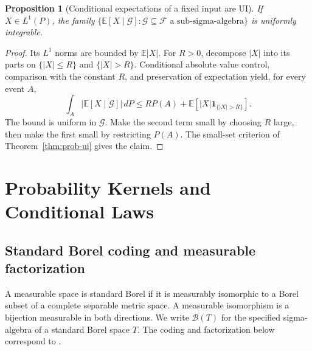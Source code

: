 \documentclass[11pt,oneside,openany]{book}
\theoremstyle{plain}
\newtheorem{proposition}[theorem]{Proposition}
\theoremstyle{definition}
\theoremstyle{remark}
\begin{document}
\begin{proposition}[Conditional expectations of a fixed input are UI]
\label{thm:prob-condexp-ui}
If \(X\in L^1(P)\), the family
\(\{\mathbb E[X\mid\mathcal G]:\mathcal G\subseteq\mathcal F
\text{ a sub-sigma-algebra}\}\) is uniformly integrable.
\end{proposition}
\begin{proof}
Its \(L^1\) norms are bounded by \(\mathbb E|X|\).
For \(R>0\), decompose \(|X|\) into its parts on
\(\{|X|\le R\}\) and \(\{|X|>R\}\). Conditional absolute value
control, comparison with the constant \(R\), and preservation of
expectation yield, for every event \(A\),
\[
 \int_A|\mathbb E[X\mid\mathcal G]|\,dP
 \le RP(A)+\mathbb E[|X|\mathbf 1_{\{|X|>R\}}].
\]
The bound is uniform in \(\mathcal G\). Make the second term
small by choosing \(R\) large, then make the first small by
restricting \(P(A)\). The small-set criterion of
Theorem~\ref{thm:prob-ui} gives the claim.
\end{proof}
\chapter{Probability Kernels and Conditional Laws}

\section{Standard Borel coding and measurable factorization}\label{p04-01}

A measurable space is standard Borel if it is measurably isomorphic to a Borel subset of a complete separable metric space. A measurable isomorphism is a bijection measurable in both directions. We write \(\mathcal B(T)\) for the specified sigma-algebra of a standard Borel space \(T\). The coding and factorization below correspond to \cite[Theorem 1.8 and Lemma 1.14, pp.~14--18]{Kallenberg}.
\end{document}

